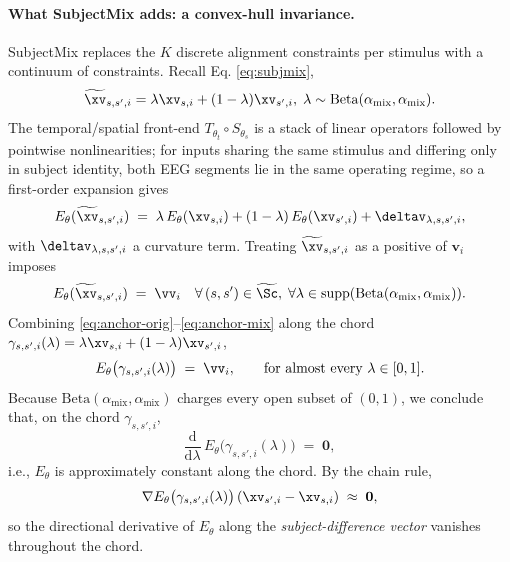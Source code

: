 \paragraph{What SubjectMix adds: a convex-hull invariance.}
SubjectMix replaces the $K$ discrete alignment constraints per stimulus
with a continuum of constraints. Recall Eq. \ref{eq:subjmix},
$$\widetilde{\xv}_{s,s',i}
   =\lambda\xv_{s,i}+(1-\lambda)\xv_{s',i},\; \lambda\sim\mathrm{Beta}(\alpha_{\mathrm{mix}},\alpha_{\mathrm{mix}}).$$
The temporal/spatial front-end $T_{\theta_t}\!\circ S_{\theta_s}$ is a
stack of linear operators followed by pointwise nonlinearities; for
inputs sharing the same stimulus and differing only in subject identity,
both EEG segments lie in the same operating regime, so a first-order
expansion gives
\begin{equation}
    E_\theta(\widetilde{\xv}_{s,s',i})
    \;=\;
    \lambda\,E_\theta(\xv_{s,i})
    +(1-\lambda)\,E_\theta(\xv_{s',i})
    + {\deltav}_{\lambda,s,s',i},
    \label{eq:mix-linearity}
\end{equation}
with ${\deltav}_{\lambda,s,s',i}$ a curvature term. Treating
$\widetilde{\xv}_{s,s',i}$ as a positive of $\mathbf{v}_i$
imposes
\begin{equation}
    E_\theta(\widetilde{\xv}_{s,s',i})\;=\;\vv_i
    \quad\forall\,(s,s')\in\widetilde{\Sc},\;\forall\lambda
    \in\mathrm{supp}(\mathrm{Beta}(\alpha_{\mathrm{mix}},\alpha_{\mathrm{mix}})).
    \label{eq:anchor-mix}
\end{equation}
Combining \eqref{eq:anchor-orig}--\eqref{eq:anchor-mix} along the chord
$\gamma_{s,s',i}(\lambda)
 =\lambda\xv_{s,i}+(1-\lambda)\xv_{s',i}$,
\begin{equation*}
    E_\theta\bigl(\gamma_{s,s',i}(\lambda)\bigr)\;=\;\vv_i,
    \qquad\text{for almost every }\lambda\in[0,1].
\end{equation*}
Because $\mathrm{Beta}(\alpha_{\mathrm{mix}},\alpha_{\mathrm{mix}})$
charges every open subset of $(0,1)$, we conclude that, on the chord
$\gamma_{s,s',i}$,
\begin{equation}
    \frac{\mathrm{d}}{\mathrm{d}\lambda}\,
    E_\theta\bigl(\gamma_{s,s',i}(\lambda)\bigr)\;=\;\mathbf{0},
    \label{eq:directional}
\end{equation}
i.e., $E_\theta$ is approximately constant along the chord. By the chain
rule,
\begin{equation*}
    \nabla E_\theta\bigl(\gamma_{s,s',i}(\lambda)\bigr)\,
    (\xv_{s',i}-\xv_{s,i})\;\approx\;\mathbf{0},
\end{equation*}
so the directional derivative of $E_\theta$ along the
\emph{subject-difference vector} vanishes throughout the chord.

